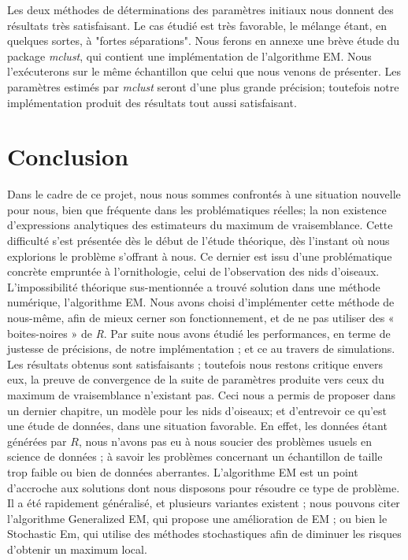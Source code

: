 \documentclass[frenchb]{report}
\newcommand{\1}{\mathbbm{1}}
\theoremstyle{definition}\newtheorem{defn}{Définition}
\theoremstyle{definition}\newtheorem{exm}{Exemple}
\theoremstyle{definition}\newtheorem{nota}{Notation}
\theoremstyle{definition}\newtheorem{rem}{Remarque}
\begin{document}
Les deux méthodes de déterminations des paramètres initiaux nous donnent des résultats très satisfaisant. Le cas étudié est très favorable, le mélange étant, en quelques sortes, à "fortes séparations".  \newline
\break
Nous ferons en annexe une brève étude du package \textit{mclust}, qui contient une implémentation de l'algorithme EM. Nous l'exécuterons sur le même échantillon que celui que nous venons de présenter. Les paramètres estimés par \textit{mclust} seront d'une plus grande précision; toutefois notre implémentation produit des résultats tout aussi satisfaisant.
 

\chapter*{Conclusion}

Dans le cadre de ce projet, nous nous sommes confrontés à une situation nouvelle pour nous, bien que fréquente dans les problématiques réelles; la non existence d’expressions analytiques des estimateurs du maximum de vraisemblance. Cette difficulté s'est présentée dès le début de l'étude théorique, dès l'instant où nous explorions le problème s'offrant à nous. Ce dernier est issu d'une problématique concrète empruntée à l'ornithologie, celui de l'observation des nids d'oiseaux. \newline
\break 
L'impossibilité théorique sus-mentionnée a trouvé solution dans une méthode numérique, l’algorithme EM. \newline
\break
Nous avons choisi d’implémenter cette méthode de nous-même, afin de mieux cerner son fonctionnement, et de ne pas utiliser des « boites-noires » de \textit{R}. Par suite nous avons étudié les performances, en terme de justesse de précisions, de notre implémentation ; et ce au travers de simulations. Les résultats obtenus sont satisfaisants ; toutefois nous restons critique envers eux, la preuve de convergence de la suite de paramètres produite vers ceux du maximum de vraisemblance n’existant pas. \newline
Ceci nous a permis de proposer dans un dernier chapitre, un modèle pour les nids d’oiseaux; et d’entrevoir ce qu’est une étude de données, dans une situation favorable. En effet, les données étant générées par $R$, nous n’avons pas eu à nous soucier des problèmes usuels en science de données ; à savoir les problèmes concernant un échantillon de taille trop faible ou bien de données aberrantes.\newline
\break
L’algorithme EM est un point d’accroche aux solutions dont nous disposons pour résoudre ce type de problème. Il a été rapidement généralisé, et plusieurs variantes existent ; nous pouvons citer l’algorithme Generalized EM, qui propose une amélioration de EM ; ou bien le Stochastic Em, qui utilise des méthodes stochastiques afin de diminuer les risques d’obtenir un maximum local.
\end{document}
